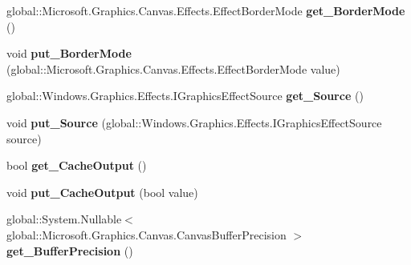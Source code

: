\begin{DoxyCompactItemize}
global\+::\+Microsoft.\+Graphics.\+Canvas.\+Effects.\+Effect\+Border\+Mode {\bfseries get\+\_\+\+Border\+Mode} ()
\item 
\mbox{\label{class_microsoft_1_1_graphics_1_1_canvas_1_1_effects_1_1_gaussian_blur_effect_af4c57d16f0f76baf8d713b866be1aa8e}} 
void {\bfseries put\+\_\+\+Border\+Mode} (global\+::\+Microsoft.\+Graphics.\+Canvas.\+Effects.\+Effect\+Border\+Mode value)
\item 
\mbox{\label{class_microsoft_1_1_graphics_1_1_canvas_1_1_effects_1_1_gaussian_blur_effect_af0d443d7aeeb6d8541a6d4b8d0a7d372}} 
global\+::\+Windows.\+Graphics.\+Effects.\+I\+Graphics\+Effect\+Source {\bfseries get\+\_\+\+Source} ()
\item 
\mbox{\label{class_microsoft_1_1_graphics_1_1_canvas_1_1_effects_1_1_gaussian_blur_effect_add0eb1e5c62d97e901bb02b01de846c2}} 
void {\bfseries put\+\_\+\+Source} (global\+::\+Windows.\+Graphics.\+Effects.\+I\+Graphics\+Effect\+Source source)
\item 
\mbox{\label{class_microsoft_1_1_graphics_1_1_canvas_1_1_effects_1_1_gaussian_blur_effect_a047fc3cd1ad5bc5aaaeff65c2dab8c8d}} 
bool {\bfseries get\+\_\+\+Cache\+Output} ()
\item 
\mbox{\label{class_microsoft_1_1_graphics_1_1_canvas_1_1_effects_1_1_gaussian_blur_effect_a896e2e8ccc6286112070e770e35269d8}} 
void {\bfseries put\+\_\+\+Cache\+Output} (bool value)
\item 
\mbox{\label{class_microsoft_1_1_graphics_1_1_canvas_1_1_effects_1_1_gaussian_blur_effect_a5aaa8d9c48f4d44cf33eb0d5cb7dd589}} 
global\+::\+System.\+Nullable$<$ global\+::\+Microsoft.\+Graphics.\+Canvas.\+Canvas\+Buffer\+Precision $>$ {\bfseries get\+\_\+\+Buffer\+Precision} ()
\item 
\mbox{\label{class_microsoft_1_1_graphics_1_1_canvas_1_1_effects_1_1_gaussian_blur_effect_ac6810cc47159f18c778ee64dc56ded36}} 

\end{DoxyCompactItemize}
